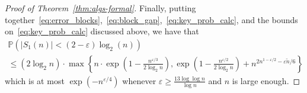 \documentclass[10pt,a4paper]{amsart}
\renewcommand{\Pr}{\mathbb{P}}
\newcommand{\eps}{\varepsilon}
\begin{document}
\begin{proof}[Proof of Theorem~\ref{thm:algs-formal}]
Finally, putting together~\eqref{eq:error_blocks},~\eqref{eq:block_gap},~\eqref{eq:key_prob_calc}, and the bounds on~\eqref{eq:key_prob_calc} discussed above, we have that 
\begin{multline}\label{eq:greedy_final_error_prob}
\Pr \left( |S_{1}(n)| < (2-\eps) \log_{2}(n) \right) \\
\leq (2 \log_2 n) \cdot 
\max \left\{ n \cdot \exp \left( 1 - \frac{n^{\eps/3}}{2 \log_2 n} \right), 
\exp \left( 1 - \frac{n^{\eps/2}}{2 \log_2 n} \right) + n^{2n^{1-\eps/2} - \eps \widetilde{n}/6} \right\}
\end{multline}
which is at most $\exp\left( - n^{\eps/4} \right)$ 
whenever $\eps \geq \frac{13 \log \log n}{\log n}$ 
and $n$ is large enough. 
\end{proof}
\end{document}
